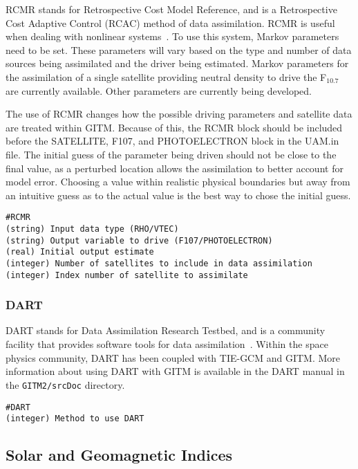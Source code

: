 RCMR stands for Retrospective Cost Model Reference, and is a Retrospective Cost Adaptive Control (RCAC) method of data assimilation.  RCMR is useful when dealing with nonlinear systems~\citep{Ali:2012aa}.  To use this system, Markov parameters need to be set.  These parameters will vary based on the type and number of data sources being assimilated and the driver being estimated.  Markov parameters for the assimilation of a single satellite providing neutral density to drive the F$_{10.7}$ are currently available.  Other parameters are currently being developed.

The use of RCMR changes how the possible driving parameters and satellite data are treated within GITM.  Because of this, the RCMR block should be included before the SATELLITE, F107, and PHOTOELECTRON block in the UAM.in file.  The initial guess of the parameter being driven should not be close to the final value, as a perturbed location allows the assimilation to better account for model error.  Choosing a value within realistic physical boundaries but away from an intuitive guess as to the actual value is the best way to chose the initial guess.

\begin{verbatim}
#RCMR
(string) Input data type (RHO/VTEC)
(string) Output variable to drive (F107/PHOTOELECTRON)
(real) Initial output estimate
(integer) Number of satellites to include in data assimilation
(integer) Index number of satellite to assimilate
\end{verbatim}

\subsubsection{DART}
\label{dart.sec}

DART stands for Data Assimilation Research Testbed, and is a community facility that provides software tools for data assimilation~\citep{Anderson:2009fn}.  Within the space physics community, DART has been coupled with TIE-GCM and GITM.  More information about using DART with GITM is available in the DART manual in the {\tt GITM2/srcDoc} directory.

\begin{verbatim}
#DART
(integer) Method to use DART
\end{verbatim}

\subsection{Solar and Geomagnetic Indices}
\label{indices.sec}

